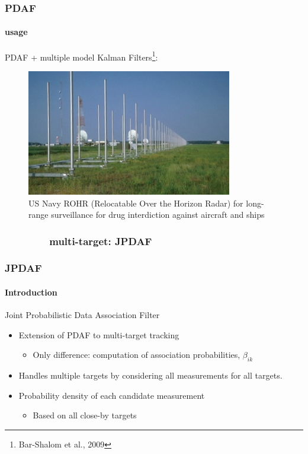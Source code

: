 \begin{frame}
\frametitle{PDAF}
\framesubtitle{usage}
\logoCSIPCPL\mypagenum
	PDAF + multiple model Kalman Filters\footnote{Bar-Shalom et al., 2009}:
	\begin{figure}
		\includegraphics[width=0.8\textwidth]{figs/TRK_PDAF_example_US_Navy_ROTHR.jpg}
		\caption {US Navy ROHR (Relocatable Over the Horizon Radar) for long-range surveillance for drug interdiction against aircraft and ships}
	\end{figure}
\end{frame}

\subsubsection{\ \ \ \ \ \ \ \ multi-target: JPDAF}

\begin{frame}
\frametitle{JPDAF}
\framesubtitle{Introduction}
\logoCSIPCPL\mypagenum
	{\color{red} Joint Probabilistic Data Association Filter}
	\begin{itemize}
		\item Extension of PDAF to multi-target tracking	
			\begin{itemize}
				\item Only difference: computation of association probabilities, $\beta_{ik}$
			\end{itemize}
		\item Handles multiple targets by considering all measurements for all targets.  
		\item Probability density of each candidate measurement
			\begin{itemize}
				\item Based on all close-by targets
			\end{itemize}
	\end{itemize}
\end{frame}


